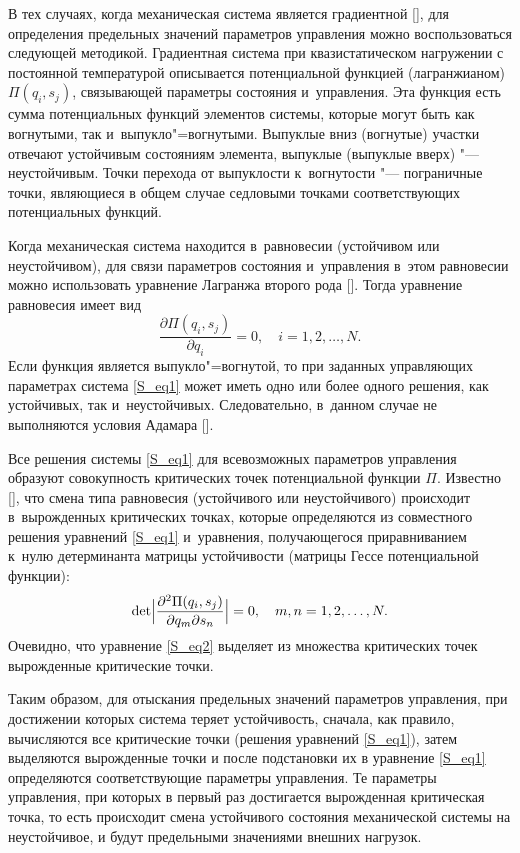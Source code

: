 В тех случаях, когда механическая система является градиентной [], для определения предельных значений параметров управления можно воспользоваться следующей методикой. Градиентная система при квазистатическом нагружении с постоянной температурой описывается потенциальной функцией (лагранжианом) $ \Pi(q_i ,s_j) $, связывающей параметры состояния и~управления. 
Эта функция есть сумма потенциальных функций элементов системы, которые могут быть как вогнутыми, так и~выпукло"=вогнутыми. 
Выпуклые вниз (вогнутые) участки отвечают  устойчивым состояниям элемента, выпуклые (выпуклые вверх) "--- неустойчивым.  
Точки перехода от выпуклости к~вогнутости "--- пограничные точки, являющиеся в общем случае седловыми точками соответствующих потенциальных функций. 

Когда механическая система находится в~равновесии (устойчивом или неустойчивом), для связи параметров состояния и~управления в~этом равновесии можно использовать уравнение Лагранжа второго рода []. 
Тогда уравнение равновесия имеет вид
\begin{equation}\label{S_eq1}
\frac{\partial\Pi(q_i,s_j)}{\partial q_i} = 0, \quad  i=1, 2, \ldots,N.
\end{equation}
Если функция   является выпукло"=вогнутой, то при заданных управляющих параметрах система \eqref{S_eq1} может иметь одно или более одного решения, как устойчивых, так и~неустойчивых. 
Следовательно, в~данном случае не выполняются условия Адамара [].

Все решения системы \eqref{S_eq1} для всевозможных параметров управления образуют совокупность критических точек потенциальной функции $ \Pi $.  
Известно [], что смена типа равновесия (устойчивого или неустойчивого) происходит в~вырожденных критических точках, которые определяются из совместного решения уравнений \eqref{S_eq1} и~уравнения, получающегося приравниванием к~нулю детерминанта матрицы устойчивости (матрицы Гессе потенциальной функции):
\begin{equation}\label{S_eq2}
\mathop{\rm det}\Bigl| \frac{\partial^{2}\Pi(q_i,s_j)}{\partial q_m \partial s_n}\Bigr|  = 0,  \quad m,n = 1, 2, \ldots, N.
\end{equation}
Очевидно, что уравнение \eqref{S_eq2} выделяет из множества критических точек вырожденные критические точки. 

Таким образом, для отыскания предельных значений параметров управления, при достижении которых система теряет устойчивость, сначала, как правило, вычисляются все критические точки (решения уравнений \eqref{S_eq1}), затем выделяются вырожденные точки и после подстановки их в уравнение \eqref{S_eq1} определяются соответствующие параметры управления. Те параметры управления, при которых в первый раз достигается вырожденная критическая точка, то есть происходит смена устойчивого состояния механической системы на неустойчивое, и будут предельными значениями внешних нагрузок.

